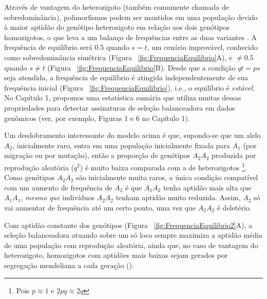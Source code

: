 \begin{refsection}
	Através de vantagem do heterozigoto (também comumente chamada de sobredominância), polimorfismos podem ser mantidos em uma população devido à maior aptidão do genótipo heterozigoto em relação aos dois genótipos homozigotos, o que leva a um balanço de frequências entre as duas variantes \parencite{Andres2011,Fijarczyk2015,Key2014b}. A frequência de equilíbrio será 0.5 quando $s=t$, um cenário improvável, conhecido como sobredominância simétrica (Figura ~\ref{fig:FrequenciaEquilibrio}A), e $\neq 0.5$ quando $s \neq t$ (Figura ~\ref{fig:FrequenciaEquilibrio}B). Desde que a condição $qt=ps$ seja atendida, a frequência de equilíbrio é atingida independentemente de sua frequência inicial (Figura ~\ref{fig:FrequenciaEquilibrio}), i.e., o equilíbrio é \emph{estável}. No Capítulo 1, propomos uma estatística sumária que utiliza muitas dessas propriedades para detectar assinaturas de seleção balanceadora em dados genômicos (ver, por exemplo, Figuras 1 e 6 no Capítulo 1). 
%

	Um desdobramento interessante do modelo acima é que, supondo-se que um alelo $A_{2}$, inicialmente raro, entra em uma população inicialmente fixada para $A_{1}$  (por migração ou por mutação), então a proporção de genótipos $A_{2}A_{2}$ produzida por reprodução aleatória ($q^{2}$) é muito baixa comparada com a de heterozigotos \footnote{Pois $p \approx 1 $ e $2pq \approx  2q$}. Como genótipos $A_{2}A_{2}$ são inicialmente muito raros, a única condição compatível com um aumento de frequência de $A_{2}$ é que $A_{1}A_{2}$ tenha aptidão mais alta que $A_{1}A_{1}$, \emph{mesmo que} indivíduos $A_{2}A_{2}$ tenham aptidão muito reduzida. Assim, $A_{2}$ só vai aumentar de frequência até um certo ponto, uma vez que $A_{2}A_{2}$ é deletério. 
    
Com aptidão constante dos genótipos (Figura ~\ref{fig:FrequenciaEquilibrio2}A), a seleção balanceadora atuando sobre um só loco sempre maximiza a aptidão média de uma população com reprodução aleatória, ainda que, no caso de vantagem do heterozigoto, homozigotos com aptidões mais baixas sejam gerados por segregação mendeliana a cada geração (\cite{Charlesworth2010}). 



\end{refsection}

